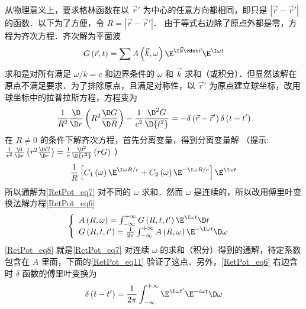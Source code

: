 从物理意义上，要求格林函数在以 $\vec r'$ 为中心的任意方向都相同，即只是 $\left| {\vec r - \vec r'} \right|$ 的函数．以下为了方便，令 $R = \left| {\vec r - \vec r'} \right|$． 
由于等式右边除了原点外都是零，方程为齐次方程．齐次解为平面波
\begin{equation}
G\left( {\vec r,t} \right) = \sum {A\left( {\vec k,\omega } \right){\E^{\I \vec k \vdot \vec r}}{\E^{\I\omega t}}} 
\end{equation} 
求和是对所有满足 $\omega /k = c$ 和边界条件的 $\omega$ 和 $\vec k$ 求和（或积分）．但显然该解在原点不满足要求．为了排除原点，且满足对称性，以 $\vec r'$ 为原点建立球坐标，改用球坐标中的拉普拉斯方程，方程变为
\begin{equation}\label{RetPot_eq6}
\frac{1}{{{R^2}}}\frac{\D }{{\D r}}\left( {{R^2}\frac{{\D G}}{{\D R}}} \right) - \frac{1}{{{c^2}}}\frac{{{\D ^2}G}}{{\D {t^2}}} =  - \delta \left( {\vec r - \vec r'} \right)\delta \left( {t - t'} \right)
\end{equation} 
在 $R \ne 0$ 的条件下解齐次方程，首先分离变量，得到分离变量解
（提示: $\frac{1}{{{r^2}}}\frac{\D }{{\D r}}\left( {{r^2}\frac{{\D G}}{{\D r}}} \right) = \frac{1}{r}\frac{{{\D ^2}}}{{\D {r^2}}}\left( {rG} \right)$ ）
\begin{equation}\label{RetPot_eq7}
\frac{1}{R}\left[ {{C_1}\left( \omega  \right){\E^{\I\omega R/c}} + {C_2}\left( \omega  \right){\E^{ - \I\omega R/c}}} \right]{\E^{\I\omega t}}
\end{equation} 
所以通解为\autoref{RetPot_eq7} 对不同的 $\omega$ 求和．然而 $\omega$ 是连续的，所以改用傅里叶变换法解方程\autoref{RetPot_eq6} 
\begin{equation}\label{RetPot_eq8}
\left\{ \begin{array}{l}
A\left( {R,\omega } \right) = \int_{ - \infty }^{ + \infty } {G\left( {R,t,t'} \right){\E^{\I\omega t}}\D t} {\kern 1pt} {\kern 1pt} {\kern 1pt} {\kern 1pt} {\kern 1pt} {\kern 1pt} {\kern 1pt} {\kern 1pt} \\
G\left( {R,t,t'} \right) = \frac{1}{{2\pi }}\int_{ - \infty }^{ + \infty } {A\left( {R,\omega } \right){\E^{ - \I\omega t}}\D \omega } {\kern 1pt} {\kern 1pt} {\kern 1pt} {\kern 1pt} {\kern 1pt} {\kern 1pt} {\kern 1pt} {\kern 1pt} 
\end{array} \right.
\end{equation} 
\autoref{RetPot_eq8} 就是\autoref{RetPot_eq7} 对连续 $\omega$ 的求和（积分）得到的通解，待定系数包含在 $A$ 里面，下面的\autoref{RetPot_eq11} 验证了这点．另外，\autoref{RetPot_eq6} 右边含时 $\delta$ 函数的傅里叶变换为
\begin{equation}\label{RetPot_eq9}
\delta \left( {t - t'} \right) = \frac{1}{{2\pi }}\int_{ - \infty }^{ + \infty } {{\E^{\I\omega t'}}{\E^{ - i\omega t}}\D \omega } 
\end{equation} 
